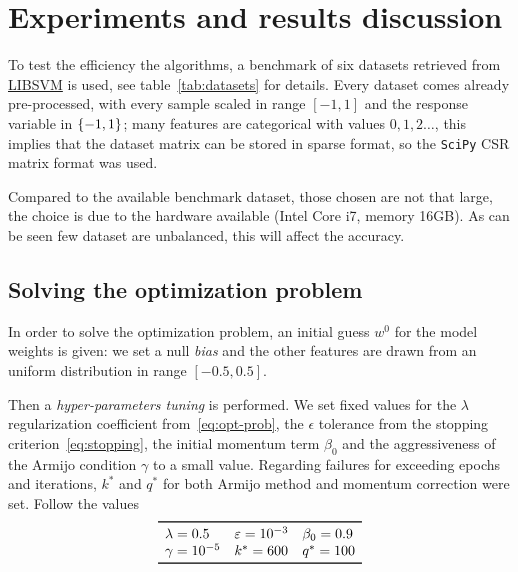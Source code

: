 
\cleardoublepage
\section{Experiments and results discussion}\label{sc:exp}

To test the efficiency the algorithms, a benchmark of six datasets retrieved from \href{https://www.csie.ntu.edu.tw/~cjlin/libsvmtools/datasets/}{LIBSVM} is used, see table~\vref{tab:datasets} for details. Every dataset comes already pre-processed, with every sample scaled in range $[-1,1]$ and the response variable in $\{-1,1\}$; many features are categorical with values $0,1,2\dots$, this implies that the dataset matrix can be stored in sparse format, so the \texttt{SciPy} CSR matrix format was used.

Compared to the available benchmark dataset, those chosen are not that large, the choice is due to the hardware available (Intel\textregistered\xspace Core\texttrademark\xspace i\num{7}, memory \mbox{\num{16}GB}). As can be seen few dataset are unbalanced, this will affect the accuracy.%

\subsection{Solving the optimization problem}

In order to solve the optimization problem, an initial guess $w^0$ for the model weights is given: we set a null \emph{bias} and the other features are drawn from an uniform distribution in range $[-0.5,0.5]$.

Then a \emph{hyper-parameters tuning} is performed. We set fixed values for the $\lambda$ regularization coefficient from~\eqref{eq:opt-prob}, the $\epsilon$ tolerance from the stopping criterion~\eqref{eq:stopping}, the initial momentum term $\beta_0$ and the aggressiveness of the Armijo condition $\gamma$ to a small value. Regarding failures for exceeding epochs and iterations, $k^\ast$ and $q^\ast$ for both Armijo method and momentum correction were set. Follow the values
\[
\begin{array}{lll}
\toprule
\lambda=0.5 & \epsilon=\num{e-3} & \beta_0=0.9 \\
\gamma=\num{e-5} & k^\ast=600 & q^\ast=100 \\
\bottomrule
\end{array}
\]

